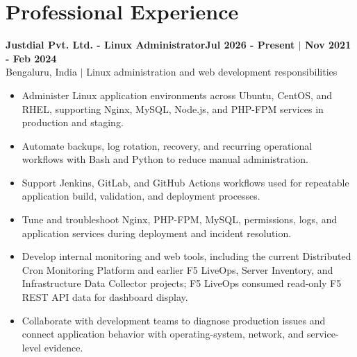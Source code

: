\documentclass[9pt,a4paper]{article}
\newcommand{\entryhead}[2]{\textbf{\color{dark}#1}\hfill\textbf{\footnotesize\color{muted}#2}}
\begin{document}
\section{Professional Experience}
\entryhead{Justdial Pvt. Ltd. - Linux Administrator}{Jul 2026 - Present $|$ Nov 2021 - Feb 2024}\\[-1pt]
{\footnotesize\color{muted}Bengaluru, India $|$ Linux administration and web development responsibilities}
\begin{itemize}
  \item Administer Linux application environments across Ubuntu, CentOS, and RHEL, supporting Nginx, MySQL, Node.js, and PHP-FPM services in production and staging.
  \item Automate backups, log rotation, recovery, and recurring operational workflows with Bash and Python to reduce manual administration.
  \item Support Jenkins, GitLab, and GitHub Actions workflows used for repeatable application build, validation, and deployment processes.
  \item Tune and troubleshoot Nginx, PHP-FPM, MySQL, permissions, logs, and application services during deployment and incident resolution.
  \item Develop internal monitoring and web tools, including the current Distributed Cron Monitoring Platform and earlier F5 LiveOps, Server Inventory, and Infrastructure Data Collector projects; F5 LiveOps consumed read-only F5 REST API data for dashboard display.
  \item Collaborate with development teams to diagnose production issues and connect application behavior with operating-system, network, and service-level evidence.
\end{itemize}
\end{document}
